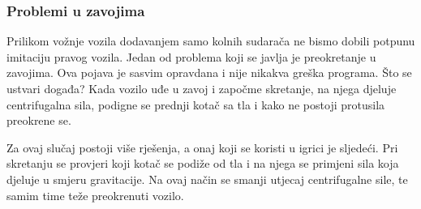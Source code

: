 \subsubsection{Problemi u zavojima}
Prilikom vožnje vozila dodavanjem samo kolnih sudarača ne bismo dobili potpunu imitaciju pravog vozila. Jedan od problema koji se javlja je preokretanje u zavojima. Ova pojava je sasvim opravdana i nije nikakva greška programa. Što se ustvari događa? Kada vozilo uđe u zavoj i započme skretanje, na njega djeluje centrifugalna sila, podigne se prednji kotač sa tla i kako ne postoji protusila preokrene se. \par
Za ovaj slučaj postoji više rješenja, a onaj koji se koristi u igrici je sljedeći. Pri skretanju se provjeri koji kotač se podiže od tla i na njega se primjeni sila koja djeluje u smjeru gravitacije. Na ovaj način se smanji utjecaj centrifugalne sile, te samim time teže preokrenuti vozilo.